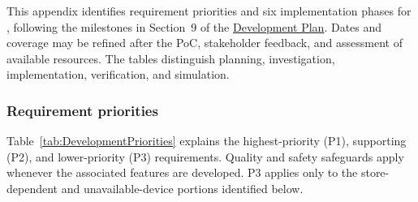 \documentclass[10pt]{article}
\begin{document}
This appendix identifies requirement priorities and six implementation
phases for \progname{}, following the milestones in
Section~9 of the
\href{https://team-hindsight.github.io/ophthamology-game/DevelopmentPlan/DevelopmentPlan.pdf}{Development Plan}.
Dates and coverage may be refined after the PoC, stakeholder feedback, and
assessment of available resources. The tables distinguish planning,
investigation, implementation, verification, and simulation.

\subsubsection*{Requirement priorities}

Table~\ref{tab:DevelopmentPriorities} explains the highest-priority (P1),
supporting (P2), and lower-priority (P3) requirements. Quality and safety
safeguards apply whenever the associated features are developed. P3 applies
only to the store-dependent and unavailable-device portions identified below.
\end{document}
